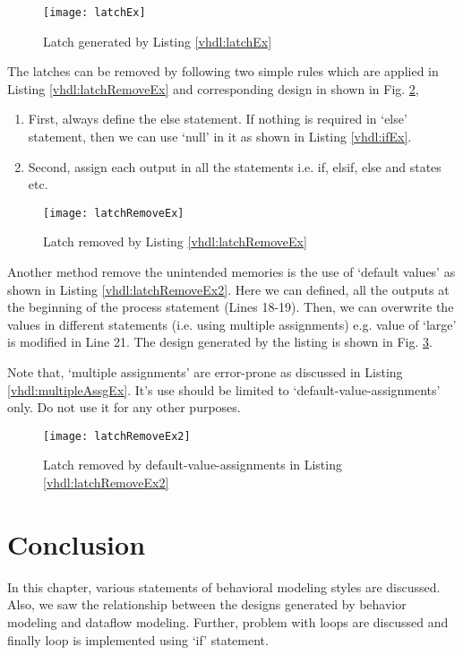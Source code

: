 \begin{figure}[!h]
	\centering
	\texttt{[image: latchEx]}
	\caption{Latch generated by Listing \ref{vhdl:latchEx}}
	\label{fig:latchEx}
\end{figure}


\begin{noNumBox}
	The latches can be removed by following two simple rules which are applied in Listing \ref{vhdl:latchRemoveEx} and corresponding design in shown in Fig. \ref{fig:latchRemoveEx}, 
	\begin{enumerate}
		\item First, always define the else statement. If nothing is required in `else' statement, then we can use `null' in it as shown in Listing \ref{vhdl:ifEx}. 
		\item Second, assign each output in all the statements i.e. if, elsif, else and states etc. 
	\end{enumerate}
\end{noNumBox}



\begin{figure}
	\centering
	\texttt{[image: latchRemoveEx]}
	\caption{Latch removed by Listing \ref{vhdl:latchRemoveEx}}
	\label{fig:latchRemoveEx}
\end{figure}


Another method remove the unintended memories is the use of `default values' as shown in Listing \ref{vhdl:latchRemoveEx2}. Here we can defined, all the outputs at the beginning of the process statement (Lines 18-19). Then, we can overwrite the values in different statements (i.e. using multiple assignments) e.g. value of `large' is modified in Line 21. The design generated by the listing is shown in Fig. \ref{fig:latchRemoveEx2}. 

\begin{noNumBox}
	Note that, `multiple assignments' are error-prone as discussed in Listing \ref{vhdl:multipleAssgEx}. It's use should be limited to `default-value-assignments' only. Do not use it for any other purposes.   
\end{noNumBox}

\begin{figure}
	\centering
	\texttt{[image: latchRemoveEx2]}
	\caption{Latch removed by default-value-assignments in Listing \ref{vhdl:latchRemoveEx2}}
	\label{fig:latchRemoveEx2}
\end{figure}

 
\section{Conclusion}
In this chapter, various statements of behavioral modeling styles are discussed. Also, we saw the relationship between the designs generated by behavior modeling and dataflow modeling. Further, problem with loops are discussed and finally loop is implemented using `if' statement. 